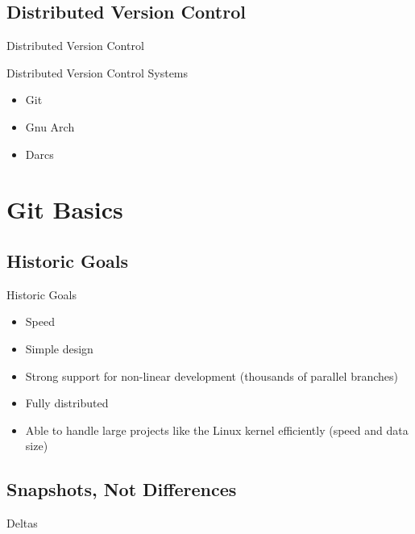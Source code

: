 \documentclass{beamer}
\begin{document}
\subsection{Distributed Version Control}

\begin{frame}{Distributed Version Control}
    \centering
    \hfill\vfill
\end{frame}

\begin{frame}{Distributed Version Control Systems}
  \begin{itemize}
  \item
    Git
  \item
    Gnu Arch
  \item
    Darcs
  \end{itemize}
\end{frame}

\section{Git Basics}

\subsection{Historic Goals}

\begin{frame}{Historic Goals}
  \begin{itemize}
  \item
    Speed
  \item
    Simple design
  \item
    Strong support for non-linear development (thousands of parallel branches)
  \item
    Fully distributed
  \item
    Able to handle large projects like the Linux kernel efficiently (speed and data size)
  \end{itemize}
\end{frame}

\subsection{Snapshots, Not Differences}

\begin{frame}{Deltas}
    \centering
    \hfill\vfill
\end{frame}
\end{document}
